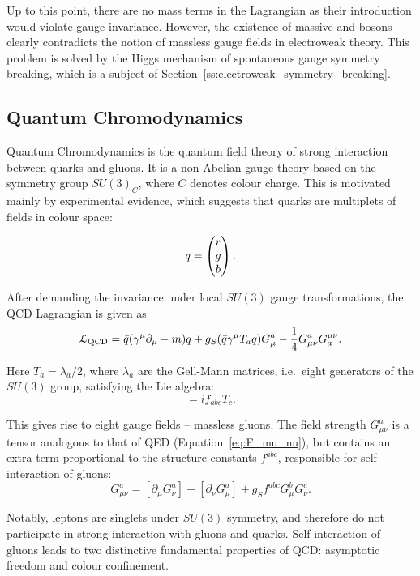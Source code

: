 Up to this point, there are no mass terms in the Lagrangian as their introduction would violate gauge invariance.
However, the existence of massive \W and \Z bosons clearly contradicts the notion of massless gauge fields in
electroweak theory. This problem is solved by the Higgs mechanism of spontaneous gauge symmetry breaking, which is a
subject of Section~\ref{ss:electroweak_symmetry_breaking}.

\newpage
\subsection{Quantum Chromodynamics}
\label{ss:QCD_theory}
Quantum Chromodynamics is the quantum field theory of strong interaction between quarks and gluons. It is a non-Abelian
gauge theory based on the symmetry group $SU(3)_C$, where $C$ denotes colour charge. This is motivated mainly by
experimental evidence, which suggests that quarks are multiplets of fields in colour space:

\begin{equation}
q = \begin{pmatrix} r \\ g \\ b \end{pmatrix}.
\end{equation} 

After demanding the invariance
under local $SU(3)$ gauge transformations, the QCD Lagrangian is given as
\begin{equation}
\label{eq:QCD_L}
\mathcal{L}_\textrm{QCD} = \bar{q} (\gamma^\mu \partial_\mu -m)q + g_S (\bar{q} \gamma^\mu T_a q) G^a_\mu -  \frac{1}{4} G^a_{\mu\nu}
G_a^{\mu\nu}.
\end{equation}

Here $T_a = \lambda_a / 2$, where $\lambda_a$ are the Gell-Mann matrices, i.e.\ eight generators of the $SU(3)$ group,
satisfying the Lie algebra:
\begin{equation}
[T_a,T_b] = i f_{abc} T_c.
\end{equation}

This gives rise to eight gauge fields -- massless gluons. The field strength $G^a_{\mu\nu}$ is a tensor analogous to
that of QED (Equation~\ref{eq:F_mu_nu}), but contains an extra term proportional to the structure constants $f^{abc}$,
responsible for self-interaction of gluons:
\begin{equation}
\label{eq:G_mu_nu}
G^a_{\mu\nu} = [\partial_\mu G^a_\nu] - [\partial_\nu G^a_\mu] + g_S f^{abc} G^b_\mu G^c_\nu.
\end{equation}

Notably, leptons are singlets under $SU(3)$ symmetry, and therefore do not participate in strong interaction with gluons
and quarks. Self-interaction of gluons leads to two distinctive fundamental properties of QCD: asymptotic freedom and
colour confinement.

